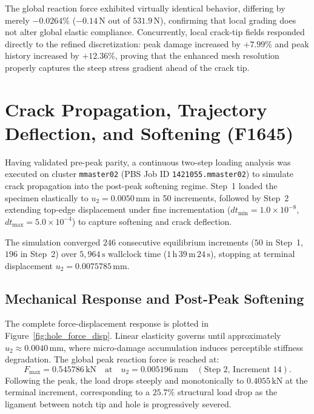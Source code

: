 The global reaction force exhibited virtually identical behavior, differing by merely $-0.0264\%$ ($-0.14\,\mathrm{N}$ out of $531.9\,\mathrm{N}$), confirming that local grading does not alter global elastic compliance. Concurrently, local crack-tip fields responded directly to the refined discretization: peak damage increased by $+7.99\%$ and peak history increased by $+12.36\%$, proving that the enhanced mesh resolution properly captures the steep stress gradient ahead of the crack tip.

\section{Crack Propagation, Trajectory Deflection, and Softening (F1645)}
\label{sec:hole_crack_propagation}

Having validated pre-peak parity, a continuous two-step loading analysis was executed on cluster \texttt{mmaster02} (PBS Job ID \texttt{1421055.mmaster02}) to simulate crack propagation into the post-peak softening regime. Step~1 loaded the specimen elastically to $u_2 = 0.0050\,\mathrm{mm}$ in 50 increments, followed by Step~2 extending top-edge displacement under fine incrementation ($dt_{\min} = 1.0 \times 10^{-8}$, $dt_{\max} = 5.0 \times 10^{-4}$) to capture softening and crack deflection.

The simulation converged $246$ consecutive equilibrium increments ($50$ in Step~1, $196$ in Step~2) over $5{,}964\,\mathrm{s}$ wallclock time ($1\,\mathrm{h}\,39\,\mathrm{m}\,24\,\mathrm{s}$), stopping at terminal displacement $u_2 = 0.0075785\,\mathrm{mm}$.

\subsection{Mechanical Response and Post-Peak Softening}
\label{subsec:hole_mechanical_response}

The complete force-displacement response is plotted in Figure~\ref{fig:hole_force_disp}. Linear elasticity governs until approximately $u_2 \approx 0.0040\,\mathrm{mm}$, where micro-damage accumulation induces perceptible stiffness degradation. The global peak reaction force is reached at:
\begin{equation}
  F_{\max} = 0.545786\,\mathrm{kN} \quad \text{at} \quad u_2 = 0.005196\,\mathrm{mm} \quad (\text{Step~2, Increment~14}).
  \label{eq:hole_peak_force}
\end{equation}
Following the peak, the load drops steeply and monotonically to $0.4055\,\mathrm{kN}$ at the terminal increment, corresponding to a $25.7\%$ structural load drop as the ligament between notch tip and hole is progressively severed.


